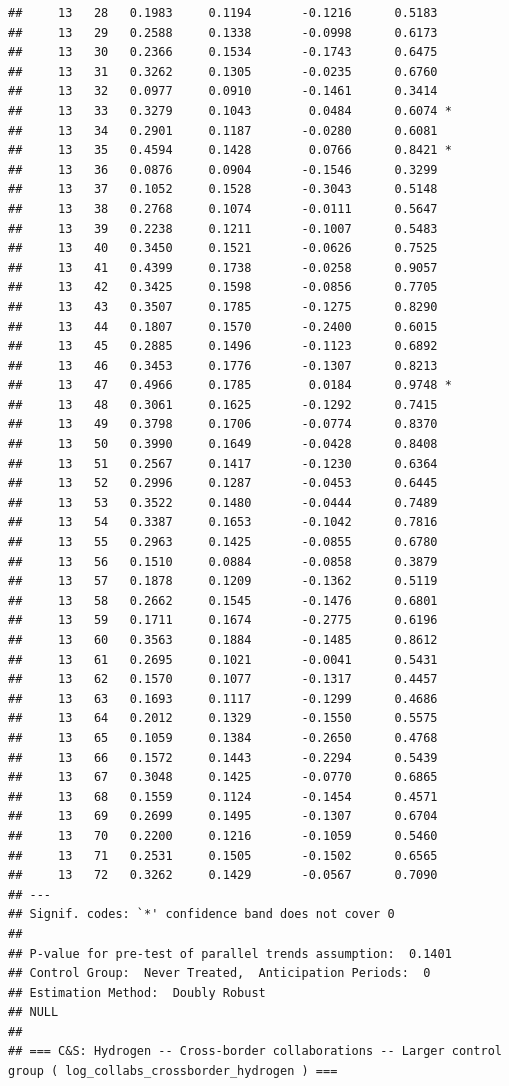 \documentclass[
]{article}
\begin{document}
\begin{verbatim}
##     13   28   0.1983     0.1194       -0.1216      0.5183  
##     13   29   0.2588     0.1338       -0.0998      0.6173  
##     13   30   0.2366     0.1534       -0.1743      0.6475  
##     13   31   0.3262     0.1305       -0.0235      0.6760  
##     13   32   0.0977     0.0910       -0.1461      0.3414  
##     13   33   0.3279     0.1043        0.0484      0.6074 *
##     13   34   0.2901     0.1187       -0.0280      0.6081  
##     13   35   0.4594     0.1428        0.0766      0.8421 *
##     13   36   0.0876     0.0904       -0.1546      0.3299  
##     13   37   0.1052     0.1528       -0.3043      0.5148  
##     13   38   0.2768     0.1074       -0.0111      0.5647  
##     13   39   0.2238     0.1211       -0.1007      0.5483  
##     13   40   0.3450     0.1521       -0.0626      0.7525  
##     13   41   0.4399     0.1738       -0.0258      0.9057  
##     13   42   0.3425     0.1598       -0.0856      0.7705  
##     13   43   0.3507     0.1785       -0.1275      0.8290  
##     13   44   0.1807     0.1570       -0.2400      0.6015  
##     13   45   0.2885     0.1496       -0.1123      0.6892  
##     13   46   0.3453     0.1776       -0.1307      0.8213  
##     13   47   0.4966     0.1785        0.0184      0.9748 *
##     13   48   0.3061     0.1625       -0.1292      0.7415  
##     13   49   0.3798     0.1706       -0.0774      0.8370  
##     13   50   0.3990     0.1649       -0.0428      0.8408  
##     13   51   0.2567     0.1417       -0.1230      0.6364  
##     13   52   0.2996     0.1287       -0.0453      0.6445  
##     13   53   0.3522     0.1480       -0.0444      0.7489  
##     13   54   0.3387     0.1653       -0.1042      0.7816  
##     13   55   0.2963     0.1425       -0.0855      0.6780  
##     13   56   0.1510     0.0884       -0.0858      0.3879  
##     13   57   0.1878     0.1209       -0.1362      0.5119  
##     13   58   0.2662     0.1545       -0.1476      0.6801  
##     13   59   0.1711     0.1674       -0.2775      0.6196  
##     13   60   0.3563     0.1884       -0.1485      0.8612  
##     13   61   0.2695     0.1021       -0.0041      0.5431  
##     13   62   0.1570     0.1077       -0.1317      0.4457  
##     13   63   0.1693     0.1117       -0.1299      0.4686  
##     13   64   0.2012     0.1329       -0.1550      0.5575  
##     13   65   0.1059     0.1384       -0.2650      0.4768  
##     13   66   0.1572     0.1443       -0.2294      0.5439  
##     13   67   0.3048     0.1425       -0.0770      0.6865  
##     13   68   0.1559     0.1124       -0.1454      0.4571  
##     13   69   0.2699     0.1495       -0.1307      0.6704  
##     13   70   0.2200     0.1216       -0.1059      0.5460  
##     13   71   0.2531     0.1505       -0.1502      0.6565  
##     13   72   0.3262     0.1429       -0.0567      0.7090  
## ---
## Signif. codes: `*' confidence band does not cover 0
## 
## P-value for pre-test of parallel trends assumption:  0.1401
## Control Group:  Never Treated,  Anticipation Periods:  0
## Estimation Method:  Doubly Robust
## NULL
## 
## === C&S: Hydrogen -- Cross-border collaborations -- Larger control group ( log_collabs_crossborder_hydrogen ) ===
\end{verbatim}
\end{document}
